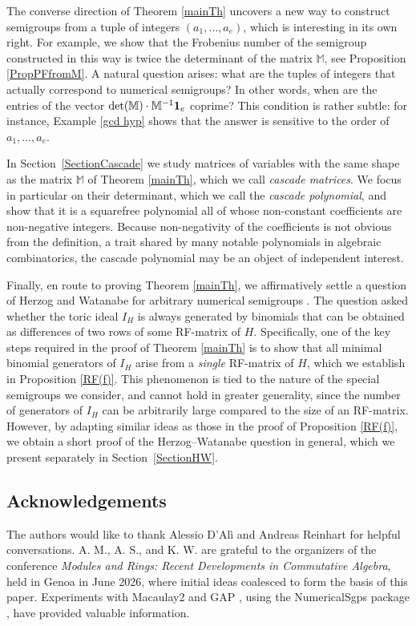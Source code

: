 \documentclass[11pt,twoside]{amsart}
\def\bbM{{\mathbb M}}
\theoremstyle{definition}
\numberwithin{equation}{section}
\begin{document}
The converse direction of 
Theorem \ref{mainTh} uncovers  a new way to construct  semigroups from a tuple of integers $(a_1, \ldots, a_e) $, which is interesting in its own right.
For example, 
we show that the Frobenius number of the semigroup constructed in this way is twice the determinant of the matrix $\bbM$, see Proposition \ref{PropPFfromM}.
A natural question arises:
what are the tuples of integers that actually correspond to numerical semigroups? 
In other words, when are the entries of the vector $\det(\bbM) \cdot \bbM^{-1}{\bf 1}_e$ coprime?
This condition is rather  subtle: for instance,  Example \ref{gcd hyp} shows that the answer is  sensitive to the order of $a_1, \ldots, a_e$.


In Section~\ref{SectionCascade} we study matrices of variables with the same shape as the matrix $\bbM$ of Theorem \ref{mainTh}, which we call \emph{cascade matrices}.
We focus in particular on their determinant, which we call the \emph{cascade polynomial}, 
and show that it is a squarefree polynomial all of 
whose non-constant coefficients are non-negative integers.
Because non-negativity of the coefficients is not obvious from the definition, 
a trait shared by many notable polynomials in algebraic combinatorics, 
the cascade polynomial may be an object of independent interest.


Finally, en route to proving Theorem \ref{mainTh}, we affirmatively settle a question of Herzog and Watanabe for arbitrary numerical semigroups \cite[Question 3.6]{HW}.
The question asked  whether the toric ideal $I_H$ is always generated by binomials that can be obtained as differences of two rows of some RF-matrix of $H$.
Specifically,
one of the key steps required in the proof of Theorem \ref{mainTh} is to show that all minimal binomial generators of $I_H$ arise from a \emph{single} RF-matrix of $H$,
which we establish in Proposition \ref{RF(f)}.
This phenomenon is tied  to the nature of the special semigroups we consider, and  cannot hold in greater generality, since the number of generators of $I_H$ can be arbitrarily large compared to  the size of an RF-matrix.
However, 
by adapting similar ideas as those in the proof of Proposition \ref{RF(f)}, we obtain a short proof  of the Herzog--Watanabe question in general, which we present separately in Section~\ref{SectionHW}.



\subsection*{Acknowledgements}
The authors would like to thank Alessio D'Alì and Andreas Reinhart for helpful conversations.
A. M., A. S., and K. W. are grateful to the organizers of the conference \emph{Modules and Rings: Recent Developments in Commutative Algebra}, held in Genoa in June 2026, 
where initial ideas coalesced to form the basis of this paper.
Experiments with Macaulay2 \cite{M2} and GAP \cite{GAP}, using the NumericalSgps package \cite{DGM}, have provided valuable information.
\end{document}
